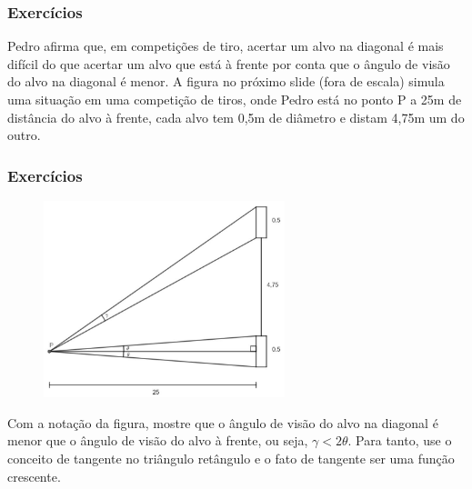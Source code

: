 
\begin{frame}
\frametitle{Exercícios} 
  
\begin{exercise}
	Pedro afirma que, em competições de tiro, acertar um alvo na diagonal é mais difícil do que acertar um alvo que está à frente por conta que o ângulo de visão do alvo na diagonal é menor. A figura no próximo slide (fora de escala) simula uma situação em uma competição de tiros, onde Pedro está no ponto P a 25m de distância do alvo à frente, cada alvo tem 0,5m de diâmetro e distam 4,75m um do outro.
\end{exercise}

\end{frame}



\begin{frame}
\frametitle{Exercícios} 

		  \begin{figure}[H]
			\centering 
			\includegraphics[width=7cm]{figures/exercicio-angulos-de-visao.png} 
			\label{fig:angulos-de-visao}
		  \end{figure}
		  Com a notação da figura, mostre que o ângulo de visão do alvo na diagonal é menor que o ângulo de visão do alvo à frente, ou seja, $\gamma < 2\theta$. Para tanto, use o conceito de tangente no triângulo retângulo e o fato de tangente ser uma função crescente. %
  

\end{frame}

